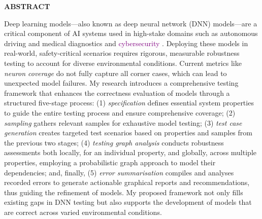 
\begin{center}
{\fontsize{16}{15} \bf ABSTRACT}
\vspace{0.4cm}
\end{center}
\normalsize

Deep learning 
models---also known as deep neural network (DNN) models---are 
a critical component of AI systems 
used in high-stake domains 
such as 
autonomous driving and
medical diagnostics and \textcolor{purple}{cybersecurity} .
Deploying these models in real-world, safety-critical 
scenarios requires rigorous, measurable robustness 
testing to account for 
diverse environmental conditions.
Current metrics like \emph{neuron coverage}
do not fully capture all corner cases, 
which can lead to unexpected model failures. 
My research introduces 
a comprehensive testing framework that enhances 
the correctness evaluation of models through a 
structured five-stage process:
(1) \emph{specification} defines 
essential system properties to guide the entire testing process 
and ensure comprehensive coverage;
(2) \emph{sampling}
gathers relevant samples 
for exhaustive model testing;
(3) \emph{test case generation} 
creates targeted test scenarios
based on properties and 
samples from the previous two stages; 
(4) \emph{testing graph analysis}  
conducts robustness assessments 
both locally, for an individual property,
and globally, across multiple properties, 
employing a probabilistic graph approach
to model their dependencies;
and, finally, (5) \emph{error summarisation} 
compiles and analyses 
recorded errors to generate 
actionable graphical 
reports and recommendations, 
thus guiding the refinement of models. 
My proposed framework
 not only fills existing gaps in DNN testing but 
also supports the development of models that are correct 
across varied environmental conditions.

\clearpage

